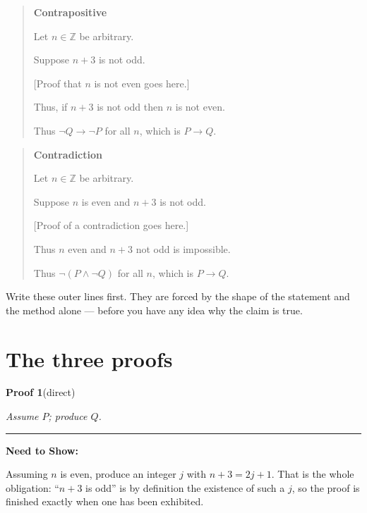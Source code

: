 \documentclass[12pt]{article}
\newcommand{\method}[3]{%
  \par\penalty-250\bigskip
  \noindent\textbf{\large Proof #1}\quad\textnormal{(#2)}%
  \par\nobreak\smallskip
  \noindent\textit{#3}%
  \par\nobreak\smallskip
  \noindent\rule{\linewidth}{0.4pt}%
  \par\nobreak\smallskip}
\newenvironment{nts}
  {\par\medskip\noindent\textbf{Need to Show:}\par\nobreak\smallskip}
  {\par\medskip}
\begin{document}
\begin{quote}
\textbf{Contrapositive}\par
Let $n\in\mathbb{Z}$ be arbitrary.\par
\hspace*{2.25em}Suppose $n+3$ is not odd.\par
\hspace*{4.5em}[Proof that $n$ is not even goes here.]\par
\hspace*{2.25em}Thus, if $n+3$ is not odd then $n$ is not even.\par
Thus $\lnot Q\rightarrow\lnot P$ for all $n$, which is $P\rightarrow Q$.
\end{quote}

\begin{quote}
\textbf{Contradiction}\par
Let $n\in\mathbb{Z}$ be arbitrary.\par
\hspace*{2.25em}Suppose $n$ is even and $n+3$ is not odd.\par
\hspace*{4.5em}[Proof of a contradiction goes here.]\par
\hspace*{2.25em}Thus $n$ even and $n+3$ not odd is impossible.\par
Thus $\lnot(P\land\lnot Q)$ for all $n$, which is $P\rightarrow Q$.
\end{quote}

\noindent
Write these outer lines first. They are forced by the shape of the statement and
the method alone --- before you have any idea why the claim is true.

\newpage
\section*{The three proofs}

\method{1}{direct}{Assume $P$; produce $Q$.}

\begin{nts}
Assuming $n$ is even, produce an integer $j$ with $n+3=2j+1$. That is the whole
obligation: ``$n+3$ is odd'' is by definition the existence of such a $j$, so
the proof is finished exactly when one has been exhibited.
\end{nts}
\end{document}
